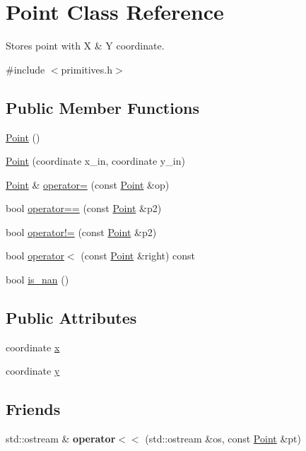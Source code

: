 \hypertarget{classPoint}{}\section{Point Class Reference}
\label{classPoint}


Stores point with X \& Y coordinate.  




{\ttfamily \#include $<$primitives.\+h$>$}

\subsection*{Public Member Functions}
\begin{DoxyCompactItemize}
\item 
\hyperlink{classPoint_ad92f2337b839a94ce97dcdb439b4325a}{Point} ()
\item 
\hyperlink{classPoint_af7373698b9fafc53b0a5d06e511642e1}{Point} (coordinate x\+\_\+in, coordinate y\+\_\+in)
\item 
\hyperlink{classPoint}{Point} \& \hyperlink{classPoint_a2e142edc132377fdc6873f6549daab2d}{operator=} (const \hyperlink{classPoint}{Point} \&op)
\item 
bool \hyperlink{classPoint_ac7bc64b9a683d5fb35780c739779f2fc}{operator==} (const \hyperlink{classPoint}{Point} \&p2)
\item 
bool \hyperlink{classPoint_ade5f3908ec0e412aea8c3e12f5d0e26f}{operator!=} (const \hyperlink{classPoint}{Point} \&p2)
\item 
bool \hyperlink{classPoint_a2d285a505e84d64a96974d5247e8ae7a}{operator$<$} (const \hyperlink{classPoint}{Point} \&right) const
\item 
bool \hyperlink{classPoint_a2bc8aed929f6be2b543ba2f26b8a5f72}{is\+\_\+nan} ()
\end{DoxyCompactItemize}
\subsection*{Public Attributes}
\begin{DoxyCompactItemize}
\item 
coordinate \hyperlink{classPoint_a2e5bf2da8d7f35ef2ca707ae5ec1929b}{x}
\item 
coordinate \hyperlink{classPoint_a4390d37c7ed19ad07212fc84df2fe26e}{y}
\end{DoxyCompactItemize}
\subsection*{Friends}
\begin{DoxyCompactItemize}
\item 
\mbox{\label{classPoint_a2c120859855730a5ff9d2eaee48471c5}} 
std\+::ostream \& {\bfseries operator$<$$<$} (std\+::ostream \&os, const \hyperlink{classPoint}{Point} \&pt)
\end{DoxyCompactItemize}


